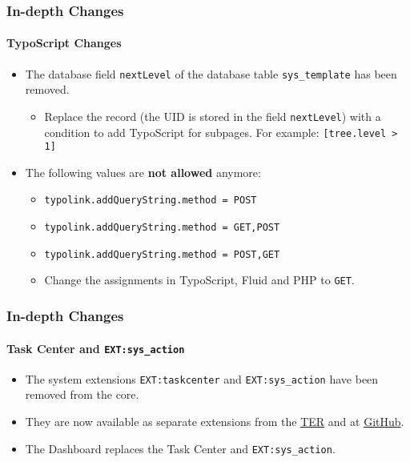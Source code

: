 \begin{frame}[fragile]
	\frametitle{In-depth Changes}
	\framesubtitle{TypoScript Changes}

	\begin{itemize}
		\item The database field \texttt{nextLevel} of the database table
			\texttt{sys\_template} has been removed.

			\begin{itemize}\smaller
				\item[\ding{228}] Replace the record (the UID is stored in the field \texttt{nextLevel}) with a condition to add TypoScript for subpages. For example: \texttt{[tree.level > 1]}
			\end{itemize}\normalsize

		\item The following values are \textbf{not allowed} anymore:

			\begin{itemize}\smaller
				\item \texttt{typolink.addQueryString.method = POST}
				\item \texttt{typolink.addQueryString.method = GET,POST}
				\item \texttt{typolink.addQueryString.method = POST,GET}
			\end{itemize}\normalsize

			\begin{itemize}\smaller
				\item[\ding{228}] Change the assignments in TypoScript, Fluid and PHP to \texttt{GET}.
			\end{itemize}\normalsize

	\end{itemize}

\end{frame}


\begin{frame}[fragile]
	\frametitle{In-depth Changes}
	\framesubtitle{Task Center and \texttt{EXT:sys\_action}}

	\begin{itemize}

		\item The system extensions \texttt{EXT:taskcenter} and \texttt{EXT:sys\_action}
			have been removed from the core.

		\item They are now available as separate extensions from the
			\href{https://extensions.typo3.org/}{TER}
			and at
			\href{https://github.com/FriendsOfTYPO3}{GitHub}.

		\item The Dashboard replaces the Task Center and \texttt{EXT:sys\_action}.

	\end{itemize}

\end{frame}

